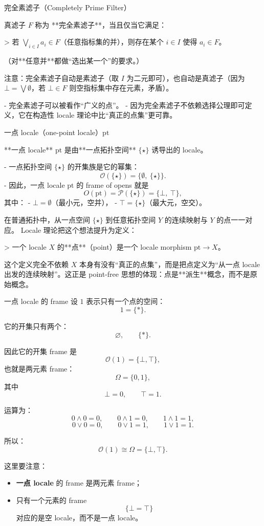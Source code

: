 \documentclass{beamer}
\begin{document}
\begin{frame}[fragile]{完全素滤子（Completely Prime Filter）}
\begin{markdown}
真滤子 $F$ 称为 **完全素滤子**，当且仅当它满足：

> 若 $\bigvee_{i\in I}a_i\in F$（任意指标集的并），则存在某个 $i\in I$ 使得 $a_i\in F$。

（对**任意并**都做“选出某一个”的要求。）

注意：完全素滤子自动是素滤子（取 $I$ 为二元即可），也自动是真滤子（因为 $\bot=\bigvee\emptyset$，若 $\bot\in F$ 则空指标集中存在元素，矛盾）。

\vspace{4ex}
- 完全素滤子可以被看作“广义的点”。
- 因为完全素滤子不依赖选择公理即可定义，它在构造性 locale 理论中比“真正的点集”更可靠。
\end{markdown}
\end{frame}

\begin{frame}[fragile]{一点 locale（one-point locale）$\mathrm{pt}$}
\begin{markdown}
**一点 locale** $\mathrm{pt}$ 是由**一点拓扑空间** $\{\star\}$ 诱导出的 locale。

- 一点拓扑空间 $\{\star\}$ 的开集族是它的幂集：
  $$
  \mathcal{O}(\{\star\}) = \{\emptyset,\ \{\star\}\}.
  $$
- 因此，一点 locale $\mathrm{pt}$ 的 frame of opens 就是
  $$
  O(\mathrm{pt}) = \mathcal{P}(\{\star\}) = \{\bot,\ \top\},
  $$
  其中：
  - $\bot = \emptyset$（最小元，空并），
  - $\top = \{\star\}$（最大元，空交）。

在普通拓扑中，从一点空间 $\{\star\}$ 到任意拓扑空间 $Y$ 的连续映射与 $Y$ 的点一一对应。  
Locale 理论把这个想法提升为定义：

> 一个 locale $X$ 的**点**（point）是一个 locale morphism $\mathrm{pt} \to X$。

这个定义完全不依赖 $X$ 本身有没有“真正的点集”，而是把点定义为“从一点 locale 出发的连续映射”。这正是 point-free 思想的体现：点是**派生**概念，而不是原始概念。
\end{markdown}
\end{frame}

\begin{frame}{一点 locale 的 frame}
设 $1$ 表示只有一个点的空间：
\[
1=\{\ast\}.
\]

它的开集只有两个：
\[
\varnothing,\qquad \{\ast\}.
\]

因此它的开集 frame 是
\[
\mathcal O(1)=\{\bot,\top\},
\]
也就是两元素 frame：
\[
\Omega=\{0,1\},
\]
其中
\[
\bot=0,\qquad \top=1.
\]

运算为：
\[
0\wedge 0=0,\qquad
0\wedge 1=0,\qquad
1\wedge 1=1,
\]
\[
0\vee 0=0,\qquad
0\vee 1=1,\qquad
1\vee 1=1.
\]

所以：
\[
\boxed{\mathcal O(1)\cong \Omega=\{\bot,\top\}.}
\]

这里要注意：
\begin{itemize}
\item \textbf{一点 locale} 的 frame 是两元素 frame；
\item 只有一个元素的 frame
  \[
  \{\bot=\top\}
  \]
  对应的是空 locale，而不是一点 locale。
\end{itemize}
\end{frame}
\end{document}
